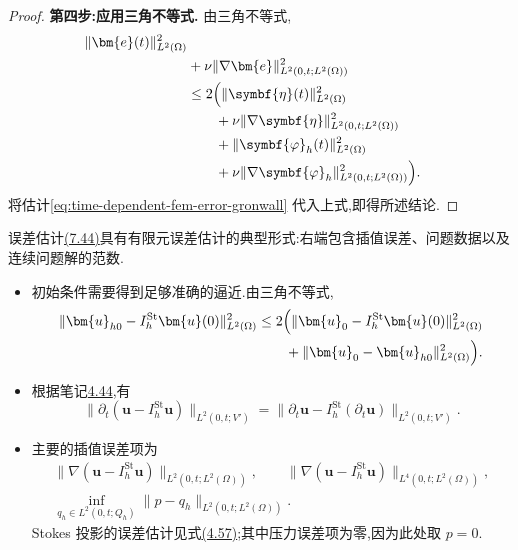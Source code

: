 \begin{theorem}
\begin{proof}
\textbf{第四步:应用三角不等式.}
由三角不等式,
\[
\begin{aligned}
  \|\bm{e}(t)\|_{L^2(\Omega)}^2\\
  &+\nu\|\nabla\bm{e}\|_{L^2(0,t;L^2(\Omega))}^2\\
  &\le 2\Bigl(
      \|\symbf{\eta}(t)\|_{L^2(\Omega)}^2\\
    &\qquad+\nu\|\nabla\symbf{\eta}\|_{L^2(0,t;L^2(\Omega))}^2\\
    &\qquad+\|\symbf{\varphi}_h(t)\|_{L^2(\Omega)}^2\\
    &\qquad+\nu\|\nabla\symbf{\varphi}_h\|_{L^2(0,t;L^2(\Omega))}^2
      \Bigr).
\end{aligned}
\]
将估计\cref{eq:time-dependent-fem-error-gronwall} 代入上式,即得所述结论.
\end{proof}
\end{theorem}

\begin{note}[关于误差估计(7.44)]
\label{note:time-dependent-fem-velocity-error-interpretation}
误差估计\hyperref[eq:time-dependent-fem-velocity-error]{(7.44)}具有有限元误差估计的典型形式:右端包含插值误差、问题数据以及连续问题解的范数.
\begin{itemize}
  \item 初始条件需要得到足够准确的逼近.由三角不等式,
  \[
  \begin{aligned}
    \|\bm{u}_{h0}-I_h^{\mathrm{St}}\bm{u}(0)\|_{L^2(\Omega)}^2
    &\le 2\Bigl(
      \|\bm{u}_0-I_h^{\mathrm{St}}\bm{u}(0)\|_{L^2(\Omega)}^2
      \\
    &\qquad+\|\bm{u}_0-\bm{u}_{h0}\|_{L^2(\Omega)}^2
    \Bigr).
  \end{aligned}
  \]
  \item 根据笔记\hyperref[note:stokes-projection-time-derivative]{4.44},有
  \[
    \|\partial_t(\bm{u}-I_h^{\mathrm{St}}\bm{u})\|_{L^2(0,t;V')}
    =
    \|\partial_t\bm{u}
      -I_h^{\mathrm{St}}(\partial_t\bm{u})\|_{L^2(0,t;V')}.
  \]
  \item 主要的插值误差项为
  \[
  \begin{gathered}
    \|\nabla(\bm{u}-I_h^{\mathrm{St}}\bm{u})\|_{L^2(0,t;L^2(\Omega))},
    \qquad
    \|\nabla(\bm{u}-I_h^{\mathrm{St}}\bm{u})\|_{L^4(0,t;L^2(\Omega))},\\
    \inf_{q_h\in L^2(0,t;Q_h)}
      \|p-q_h\|_{L^2(0,t;L^2(\Omega))}.
  \end{gathered}
  \]
  Stokes 投影的误差估计见式\hyperref[eq:stokes-projection-best-approximation-velocity]{(4.57)};其中压力误差项为零,因为此处取 $p=0$.
\end{itemize}
\end{note}

